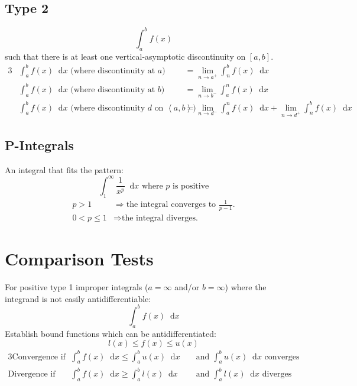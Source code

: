 \documentclass[12pt]{article}
\renewcommand*{\implies}{\Rightarrow}
\newcommand*{\D}[1]{\mathop{}\!\mathrm{d}#1}
\newcommand*{\fixmath}{%
  \makebox{}\vspace{\glueexpr-\baselineskip-\abovedisplayskip}}
\newenvironment{fixaskip}{\setlength{\abovedisplayskip}{0pt}\fixmath%
  \ignorespaces}{\ignorespacesafterend}
\newenvironment{fixskip}{\setlength{\abovedisplayskip}{0pt}%
  \setlength{\belowdisplayskip}{0pt}\fixmath\ignorespaces}%
  {\ignorespacesafterend}
\begin{document}
\subsection*{Type 2}
\begin{fixaskip}
  \[
    \int_a^b f(x)
  \]
\end{fixaskip}
such that there is at least one vertical-asymptotic discontinuity on \([a,b]\).
\begin{alignat*}{3}
  &\int_a^b f(x) \D{x} \text{ (where discontinuity at \(a\)) }
    &&= \lim_{n \to a^+} \int_n^b f(x) \D{x}\\
  &\int_a^b f(x) \D{x} \text{ (where discontinuity at \(b\)) }
    &&= \lim_{n \to b^-} \int_a^n f(x) \D{x}\\
  &\int_a^b f(x) \D{x} \text{ (where discontinuity \(d\) on
    \(\left<a,b\right>\)) } &&= \lim_{n \to d^-} \int_a^n f(x) \D{x} +
    \lim_{n \to d^+} \int_n^b f(x) \D{x}
\end{alignat*}
\subsection*{P-Integrals}
An integral that fits the pattern:
\[
  \int_1^\infty \frac{1}{x^p} \D{x} \text{ where \(p\) is positive}
\]
\begin{fixaskip}
  \begin{align*}
    p > 1 &\implies \text{the integral converges to \(\tfrac{1}{p-1}\).}\\
    0 < p \le 1 &\implies \text{the integral diverges.}
  \end{align*}
\end{fixaskip}
\section*{Comparison Tests}
For positive type 1 improper integrals (\(a = \infty\) and\slash or
\(b = \infty\)) where the integrand is not easily antidifferentiable:
\[
  \int_a^b f(x) \D{x}
\]
Establish bound functions which can be antidifferentiated:
\[
  l(x) \le f(x) \le u(x)
\]
\begin{fixskip}
  \begin{alignat*}{3}
    \text{Convergence if } &\int_a^b f(x) \D{x} \le \int_a^b u(x) \D{x}
      &&\text{ and } \int_a^b u(x) \D{x} \text{ converges}\\
    \text{Divergence if } &\int_a^b f(x) \D{x} \ge \int_a^b l(x) \D{x}
      &&\text{ and } \int_a^b l(x) \D{x} \text{ diverges}
  \end{alignat*}
\end{fixskip}
\end{document}
